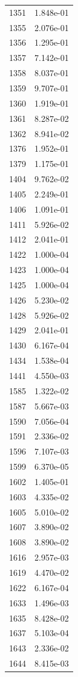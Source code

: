 \documentclass[12pt]{article}
\begin{document}
\begin{longtable}{@{}cc@{}}
1351 & 1.848e-01 \\
1355 & 2.076e-01 \\
1356 & 1.295e-01 \\
1357 & 7.142e-01 \\
1358 & 8.037e-01 \\
1359 & 9.707e-01 \\
1360 & 1.919e-01 \\
1361 & 8.287e-02 \\
1362 & 8.941e-02 \\
1376 & 1.952e-01 \\
1379 & 1.175e-01 \\
1404 & 9.762e-02 \\
1405 & 2.249e-01 \\
1406 & 1.091e-01 \\
1411 & 5.926e-02 \\
1412 & 2.041e-01 \\
1422 & 1.000e-04 \\
1423 & 1.000e-04 \\
1425 & 1.000e-04 \\
1426 & 5.230e-02 \\
1428 & 5.926e-02 \\
1429 & 2.041e-01 \\
1430 & 6.167e-04 \\
1434 & 1.538e-04 \\
1441 & 4.550e-03 \\
1585 & 1.322e-02 \\
1587 & 5.667e-03 \\
1590 & 7.056e-04 \\
1591 & 2.336e-02 \\
1596 & 7.107e-03 \\
1599 & 6.370e-05 \\
1602 & 1.405e-01 \\
1603 & 4.335e-02 \\
1605 & 5.010e-02 \\
1607 & 3.890e-02 \\
1608 & 3.890e-02 \\
1616 & 2.957e-03 \\
1619 & 4.470e-02 \\
1622 & 6.167e-04 \\
1633 & 1.496e-03 \\
1635 & 8.428e-02 \\
1637 & 5.103e-04 \\
1643 & 2.336e-02 \\
1644 & 8.415e-03 \\

\end{longtable}
\end{document}
